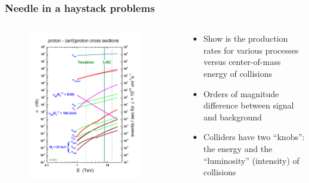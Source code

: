 \begin{frame}
\frametitle{Needle in a haystack problems}

\begin{columns}[T] %

\begin{column}{.50\textwidth}
\begin{figure}[htbp]
\begin{center}
\includegraphics[width=0.9\textwidth]{images/crosssections2013.jpeg}
\end{center}
\end{figure}
\end{column}%

\begin{column}{.50\textwidth}
\vskip 0.5in
\begin{itemize}
\item Show is the production rates for various processes versus center-of-mass energy of collisions
\item Orders of magnitude difference between signal and background
\item Colliders have two ``knobs'': the energy and the ``luminosity'' (intensity) of collisions
\end{itemize}
\end{column}%




\end{columns}


\end{frame}


